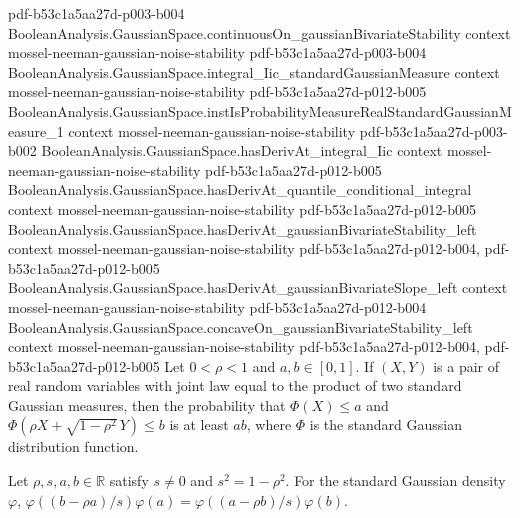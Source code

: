 \begin{lemma}
  {pdf-b53c1a5aa27d-p003-b004}
\proofstep
  {BooleanAnalysis.GaussianSpace.continuousOn_gaussianBivariateStability}
  {context}
  {mossel-neeman-gaussian-noise-stability}
  {pdf-b53c1a5aa27d-p003-b004}
\proofstep
  {BooleanAnalysis.GaussianSpace.integral_Iic_standardGaussianMeasure}
  {context}
  {mossel-neeman-gaussian-noise-stability}
  {pdf-b53c1a5aa27d-p012-b005}
\proofstep
  {BooleanAnalysis.GaussianSpace.instIsProbabilityMeasureRealStandardGaussianMeasure_1}
  {context}
  {mossel-neeman-gaussian-noise-stability}
  {pdf-b53c1a5aa27d-p003-b002}
\proofstep
  {BooleanAnalysis.GaussianSpace.hasDerivAt_integral_Iic}
  {context}
  {mossel-neeman-gaussian-noise-stability}
  {pdf-b53c1a5aa27d-p012-b005}
\proofstep
  {BooleanAnalysis.GaussianSpace.hasDerivAt_quantile_conditional_integral}
  {context}
  {mossel-neeman-gaussian-noise-stability}
  {pdf-b53c1a5aa27d-p012-b005}
\proofstep
  {BooleanAnalysis.GaussianSpace.hasDerivAt_gaussianBivariateStability_left}
  {context}
  {mossel-neeman-gaussian-noise-stability}
  {pdf-b53c1a5aa27d-p012-b004,
    pdf-b53c1a5aa27d-p012-b005}
\proofstep
  {BooleanAnalysis.GaussianSpace.hasDerivAt_gaussianBivariateSlope_left}
  {context}
  {mossel-neeman-gaussian-noise-stability}
  {pdf-b53c1a5aa27d-p012-b004}
\proofstep
  {BooleanAnalysis.GaussianSpace.concaveOn_gaussianBivariateStability_left}
  {context}
  {mossel-neeman-gaussian-noise-stability}
  {pdf-b53c1a5aa27d-p012-b004,
    pdf-b53c1a5aa27d-p012-b005}
Let $0<\rho<1$ and $a,b\in[0,1]$. If $(X,Y)$ is a pair of real random variables with
joint law equal to the product of two standard Gaussian measures, then the probability
that $\Phi(X)\le a$ and $\Phi(\rho X+\sqrt{1-\rho^2}\,Y)\le b$ is at least $ab$, where
$\Phi$ is the standard Gaussian distribution function.
\end{lemma}

\begin{lemma}
\label{BooleanAnalysis.GaussianSpace.standardGaussianPDF_correlated_symmetry}
\leanok
{}
Let $\rho,s,a,b\in\mathbb R$ satisfy $s\ne0$ and $s^2=1-\rho^2$. For the standard
Gaussian density $\varphi$, $\varphi((b-\rho a)/s)\varphi(a)=\varphi((a-\rho
b)/s)\varphi(b)$.
\end{lemma}
